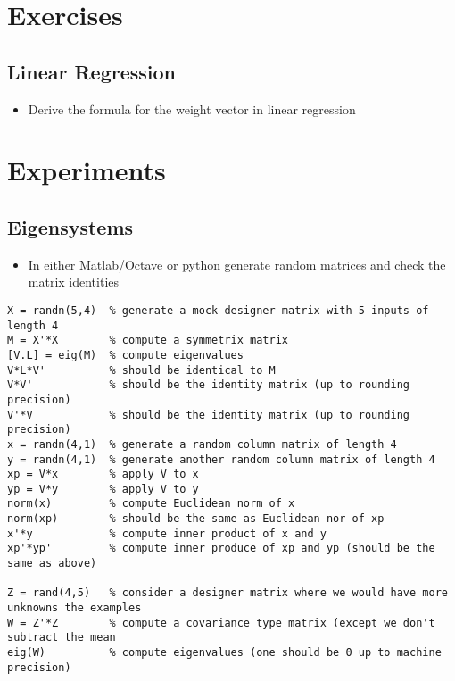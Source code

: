 \documentclass[11pt]{article}
\begin{document}
\section{Exercises}
\label{sec:orgeb01b4e}

\subsection{Linear Regression}
\label{sec:org598fb56}
\begin{itemize}
\item Derive the formula for the weight vector in linear regression
\end{itemize}

\section{Experiments}
\label{sec:orgace939c}

\subsection{Eigensystems}
\label{sec:orga9d5940}
\begin{itemize}
\item In either Matlab/Octave or python generate random matrices and check
the matrix identities
\end{itemize}

\begin{verbatim}
X = randn(5,4)  % generate a mock designer matrix with 5 inputs of length 4 
M = X'*X        % compute a symmetrix matrix
[V.L] = eig(M)  % compute eigenvalues
V*L*V'          % should be identical to M
V*V'            % should be the identity matrix (up to rounding precision)
V'*V            % should be the identity matrix (up to rounding precision)
x = randn(4,1)  % generate a random column matrix of length 4
y = randn(4,1)  % generate another random column matrix of length 4
xp = V*x        % apply V to x
yp = V*y        % apply V to y
norm(x)         % compute Euclidean norm of x
norm(xp)        % should be the same as Euclidean nor of xp
x'*y            % compute inner product of x and y
xp'*yp'         % compute inner produce of xp and yp (should be the same as above)

Z = rand(4,5)   % consider a designer matrix where we would have more unknowns the examples
W = Z'*Z        % compute a covariance type matrix (except we don't subtract the mean
eig(W)          % compute eigenvalues (one should be 0 up to machine precision)
\end{verbatim}
\end{document}

